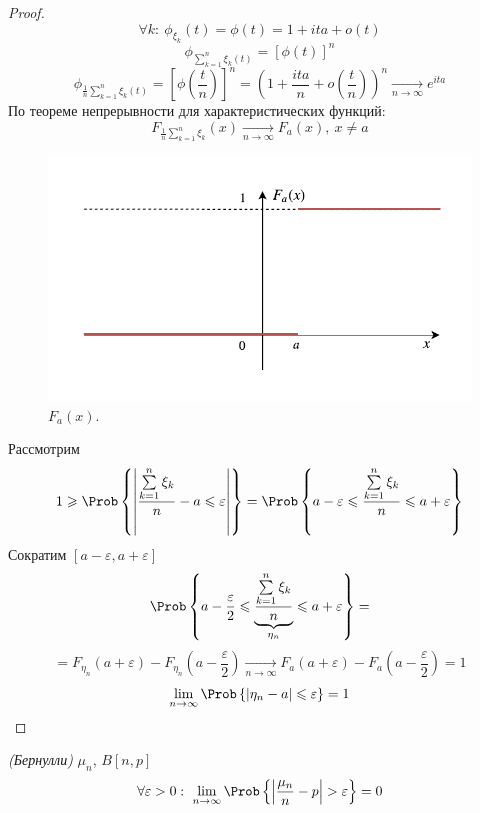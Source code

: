\begin{proof}
	\[
		\forall k: \ \phi_{\xi_k} (t) = \phi (t) = 1 + it a + o(t)
	\]
	\[
		\phi_{\sum\limits_{k = 1}^{n} \xi_k (t)} = \left[ \phi(t) \right]^n
	\]
	\[
		\phi_{\frac{1}{n} \sum\limits_{k = 1}^{n} \xi_k (t)} = \left[ \phi(\frac{t}{n}) \right]^n = \left( 1 + \frac{it a}{n} + o(\frac{t}{n}) \right)^n \underset{n \to \infty}{\rightarrow} e^{it a}
	\]
	По теореме непрерывности для характеристических функций: %
	\[
		F_{\frac{1}{n} \sum\limits_{k = 1}^{n} \xi_k} (x) \underset{n \to \infty}{\rightarrow} F_a (x), \ x \neq a
	\]
	\begin{figure}[H]
	\begin{center}
	\includegraphics[width=\textwidth,height=\textheight,keepaspectratio]{Images/plot4-1.pdf}
	\end{center}
	\caption{$F_a(x)$.}
\end{figure}
	Рассмотрим
	\[
		1 \geqslant \Prob \left\{ \left| \frac{\sum\limits_{k = 1}^{n} \xi_k}{n} - a \leqslant \varepsilon \right| \right\} = \Prob \left\{ a - \varepsilon \leqslant \frac{\sum\limits_{k = 1}^{n} \xi_k}{n} \leqslant a + \varepsilon \right\}
	\]
	Сократим $[a - \varepsilon, a + \varepsilon]$
	\[
		\Prob \left\{ a - \frac{\varepsilon}{2} \leqslant \underbrace{\frac{\sum\limits_{k = 1}^{n} \xi_k}{n}}_{\eta_n} \leqslant a + \varepsilon \right\} =
	\]
	\[
		= F_{\eta_n} (a + \varepsilon) - F_{\eta_n} \left( a - \frac{\varepsilon}{2} \right) \underset{n \to \infty}{\rightarrow} F_a \left( a + \varepsilon \right) - F_a \left(a - \frac{\varepsilon}{2} \right) = 1
	\]
	\[
		\lim\limits_{n \to \infty} \Prob \left\{ | \eta_n - a | \leqslant \varepsilon \right\} = 1
	\]
\end{proof}
\begin{theorem}
	\textit{(Бернулли)} $\mu_n$, $B [n, p]$
	\[
		\forall \varepsilon > 0: \ \lim\limits_{n \to \infty} \Prob \left\{ \left| \frac{\mu_n}{n} - p \right| > \varepsilon \right\} = 0
	\]
\end{theorem}
